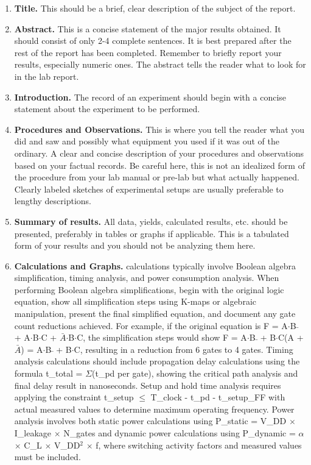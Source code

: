 \documentclass[12pt]{article}
\begin{document}
\begin{enumerate}
\item \textbf{Title.} This should be a brief, clear description of the subject of the report.

\item \textbf{Abstract.} This is a concise statement of the major results obtained. It should consist of only 2-4 complete sentences. It is best prepared after the rest of the report has been completed. Remember to briefly report your results, especially numeric ones. The abstract tells the reader what to look for in the lab report.

\item \textbf{Introduction.} The record of an experiment should begin with a concise statement about the experiment to be performed.

\item \textbf{Procedures and Observations.} This is where you tell the reader what you did and saw and possibly what equipment you used if it was out of the ordinary. A clear and concise description of your procedures and observations based on your factual records. Be careful here, this is not an idealized form of the procedure from your lab manual or pre-lab but what actually happened. Clearly labeled sketches of experimental setups are usually preferable to lengthy descriptions.

\item \textbf{Summary of results.} All data, yields, calculated results, etc. should be presented, preferably in tables or graphs if applicable. This is a tabulated form of your results and you should not be analyzing them here.

\item \textbf{Calculations and Graphs.} calculations typically involve Boolean algebra simplification, timing analysis, and power consumption analysis. When performing Boolean algebra simplifications, begin with the original logic equation, show all simplification steps using K-maps or algebraic manipulation, present the final simplified equation, and document any gate count reductions achieved. For example, if the original equation is F = A$\cdot$B$\bar{}$ + A$\cdot$B$\cdot$C + $\bar{A}$$\cdot$B$\cdot$C, the simplification steps would show F = A$\cdot$B$\bar{}$ + B$\cdot$C(A + $\bar{A}$) = A$\cdot$B$\bar{}$ + B$\cdot$C, resulting in a reduction from 6 gates to 4 gates. Timing analysis calculations should include propagation delay calculations using the formula t\_total = $\Sigma$(t\_pd per gate), showing the critical path analysis and final delay result in nanoseconds. Setup and hold time analysis requires applying the constraint t\_setup $\leq$ T\_clock - t\_pd - t\_setup\_FF with actual measured values to determine maximum operating frequency. Power analysis involves both static power calculations using P\_static = V\_DD $\times$ I\_leakage $\times$ N\_gates and dynamic power calculations using P\_dynamic = $\alpha$ $\times$ C\_L $\times$ V\_DD$^2$ $\times$ f, where switching activity factors and measured values must be included.


\end{enumerate}
\end{document}

